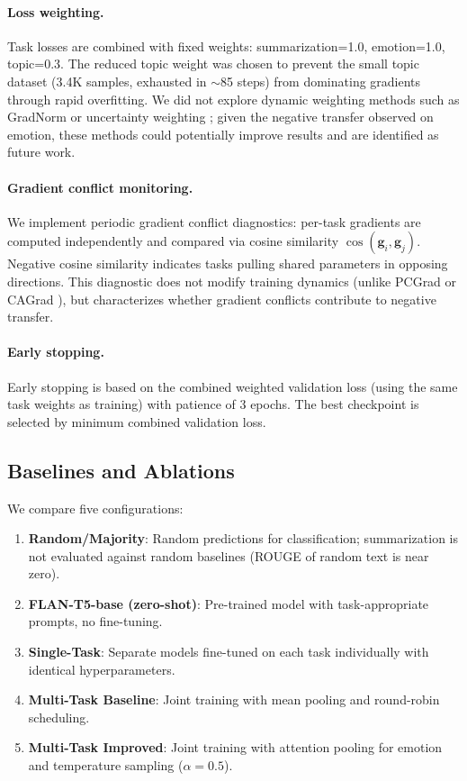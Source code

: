 \documentclass[11pt]{article}
\begin{document}
\paragraph{Loss weighting.} Task losses are combined with fixed weights: summarization=1.0, emotion=1.0, topic=0.3. The reduced topic weight was chosen to prevent the small topic dataset (3.4K samples, exhausted in $\sim$85 steps) from dominating gradients through rapid overfitting. We did not explore dynamic weighting methods such as GradNorm \citep{chen2018gradnorm} or uncertainty weighting \citep{kendall2018multi}; given the negative transfer observed on emotion, these methods could potentially improve results and are identified as future work.

\paragraph{Gradient conflict monitoring.} We implement periodic gradient conflict diagnostics: per-task gradients are computed independently and compared via cosine similarity $\cos(\mathbf{g}_i, \mathbf{g}_j)$. Negative cosine similarity indicates tasks pulling shared parameters in opposing directions. This diagnostic does not modify training dynamics (unlike PCGrad \citep{yu2020gradient} or CAGrad \citep{liu2021conflict}), but characterizes whether gradient conflicts contribute to negative transfer.

\paragraph{Early stopping.} Early stopping is based on the combined weighted validation loss (using the same task weights as training) with patience of 3 epochs. The best checkpoint is selected by minimum combined validation loss.

\subsection{Baselines and Ablations}

We compare five configurations:

\begin{enumerate}
    \item \textbf{Random/Majority}: Random predictions for classification; summarization is not evaluated against random baselines (ROUGE of random text is near zero).
    \item \textbf{FLAN-T5-base (zero-shot)}: Pre-trained model with task-appropriate prompts, no fine-tuning.
    \item \textbf{Single-Task}: Separate models fine-tuned on each task individually with identical hyperparameters.
    \item \textbf{Multi-Task Baseline}: Joint training with mean pooling and round-robin scheduling.
    \item \textbf{Multi-Task Improved}: Joint training with attention pooling for emotion and temperature sampling ($\alpha=0.5$).
\end{enumerate}
\end{document}
